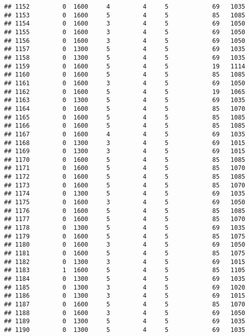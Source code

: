 \documentclass[]{article}
\begin{document}
\begin{verbatim}
## 1152         0  1600     4         4     5            69   1035
## 1153         0  1600     5         4     5            85   1085
## 1154         0  1600     3         4     5            69   1050
## 1155         0  1600     3         4     5            69   1050
## 1156         0  1600     3         4     5            69   1050
## 1157         0  1300     5         4     5            69   1035
## 1158         0  1300     5         4     5            69   1035
## 1159         0  1600     5         4     5            19   1114
## 1160         0  1600     5         4     5            85   1085
## 1161         0  1600     3         4     5            69   1050
## 1162         0  1600     5         4     5            19   1065
## 1163         0  1300     5         4     5            69   1035
## 1164         0  1600     5         4     5            85   1070
## 1165         0  1600     5         4     5            85   1085
## 1166         0  1600     5         4     5            85   1085
## 1167         0  1600     4         4     5            69   1035
## 1168         0  1300     3         4     5            69   1015
## 1169         0  1300     3         4     5            69   1015
## 1170         0  1600     5         4     5            85   1085
## 1171         0  1600     5         4     5            85   1070
## 1172         0  1600     5         4     5            85   1085
## 1173         0  1600     5         4     5            85   1070
## 1174         0  1300     5         4     5            69   1035
## 1175         0  1600     3         4     5            69   1050
## 1176         0  1600     5         4     5            85   1085
## 1177         0  1600     5         4     5            85   1070
## 1178         0  1300     5         4     5            69   1035
## 1179         0  1600     5         4     5            85   1075
## 1180         0  1600     3         4     5            69   1050
## 1181         0  1600     5         4     5            85   1075
## 1182         0  1300     3         4     5            69   1015
## 1183         1  1600     5         4     5            85   1105
## 1184         0  1300     5         4     5            69   1035
## 1185         0  1300     3         4     5            69   1020
## 1186         0  1300     3         4     5            69   1015
## 1187         0  1600     5         4     5            85   1070
## 1188         0  1600     3         4     5            69   1050
## 1189         0  1300     5         4     5            69   1035
## 1190         0  1300     5         4     5            69   1035

\end{verbatim}
\end{document}

